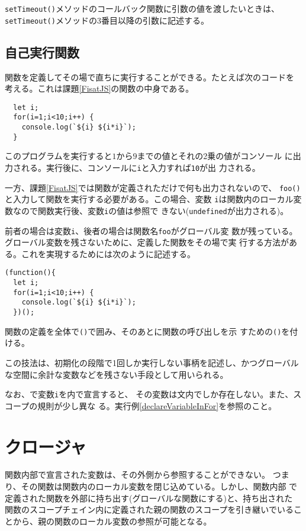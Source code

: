 \Verb+setTimeout()+メソッドのコールバック関数に引数の値を渡したいときは、
\Verb+setTimeout()+メソッドの3番目以降の引数に記述する。

%
  \subsection{自己実行関数}
関数を定義してその場で直ちに実行することができる。たとえば次のコードを
考える。これは課題\ref{FisatJS}の関数の中身である。
\begin{Verbatim}
  let i;
  for(i=1;i<10;i++) {
    console.log(`${i} ${i*i}`);
  }
\end{Verbatim}
このプログラムを実行すると$1$から$9$までの値とそれの2乗の値がコンソール
に出力される。実行後に、コンソールに\Verb+i+と入力すれば\Verb+10+が出
力される。

一方、課題\ref{FisatJS}では関数が定義されただけで何も出力されないので、
\Verb+foo()+と入力して関数を実行する必要がある。この場合、変数
\Verb+i+は関数内のローカル変数なので関数実行後、変数\Verb+i+の値は参照で
きない(\Verb+undefined+が出力される)。

前者の場合は変数\texttt{i}、後者の場合は関数名\texttt{foo}がグローバル変
数が残っている。グローバル変数を残さないために、定義した関数をその場で実
行する方法がある。これを実現するためには次のように記述する。
\begin{Verbatim}
(function(){
  let i;
  for(i=1;i<10;i++) {
    console.log(`${i} ${i*i}`);
  })();
\end{Verbatim}
関数の定義を全体で\Verb+()+で囲み、そのあとに関数の呼び出しを示
すための\Verb+()+を付ける。

この技法は、初期化の段階で1回しか実行しない事柄を記述し、かつグローバル
な空間に余計な変数などを残さない手段として用いられる。

なお、で変数\Verb+i+を内で宣言すると、
その変数は文内でしか存在しない。また、スコープの規則が少し異な
る。実行例\ref{declareVariableInFor}を参照のこと。
\iffalse
\begin{Verbatim}
  for(let i=1;i<10;i++) {
    console.log(`${i} ${i*i}`);
  }
\end{Verbatim}
\fi
\section{クロージャ}
関数内部で宣言された変数は、その外側から参照することができない。
つまり、その関数は関数内のローカル変数を閉じ込めている。しかし、関数内部
で定義された関数を外部に持ち出す(グローバルな関数にする)と、持ち出された
関数のスコープチェイン内に定義された親の関数のスコープを引き継いでいるこ
とから、親の関数のローカル変数の参照が可能となる。

